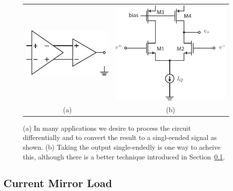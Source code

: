 \begin{figure}[tb]
\begin{center}
\begin{tabular}{cc}
\includegraphics[scale=1]{Diff_in_SE_out.pdf} &
\includegraphics[scale=1]{diffamp_SE_out_simp} \\
(a) & (b) \\
\end{tabular}
\end{center}
\caption{(a) In many applications we desire to process the circuit differentially and to convert the result to a singl-eended signal as shown.   (b) Taking the output single-endedly is one way to acheive this, although there is a better technique introduced in Section~\ref{sec:cur_mir_load}.} \label{fig:Diff_in_SE_out.pdf}
\end{figure}



\subsection{Current Mirror Load} \label{sec:cur_mir_load}


